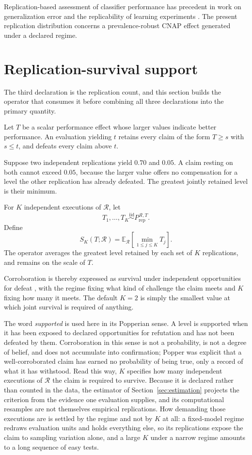 \documentclass[11pt]{article}
\newcommand{\Regime}{\mathcal{R}}
\newcommand{\E}{\mathbb{E}}
\newcommand{\iid}{\mathrel{\overset{\mathrm{iid}}{\sim}}}
\theoremstyle{remark}
\begin{document}
Replication-based assessment of classifier performance has precedent in work on generalization error and the replicability of learning experiments \cite{nadeau2003inference,bouckaert2004estimating}. The present replication distribution concerns a prevalence-robust CNAP effect generated under a declared regime.

\section{Replication-survival support}
\label{sec:support}

The third declaration is the replication count, and this section builds the operator that consumes it before combining all three declarations into the primary quantity.

Let $T$ be a scalar performance effect whose larger values indicate better performance. An evaluation yielding $t$ retains every claim of the form $T\geq s$ with $s\leq t$, and defeats every claim above $t$.

Suppose two independent replications yield $0.70$ and $0.05$. A claim resting on both cannot exceed $0.05$, because the larger value offers no compensation for a level the other replication has already defeated. The greatest jointly retained level is their minimum.

For $K$ independent executions of $\Regime$, let
\[
T_1,\ldots,T_K
\iid
P_{\mathrm{rep}}^{\Regime,T}.
\]
Define
\begin{equation}
S_K(T;\Regime)
=
\E_{\Regime}
\left[
\min_{1\leq j\leq K}T_j
\right].
\label{eq:support-operator}
\end{equation}
The operator averages the greatest level retained by each set of $K$ replications, and remains on the scale of $T$.

Corroboration is thereby expressed as survival under independent opportunities for defeat \cite{popper1959logic}, with the regime fixing what kind of challenge the claim meets and $K$ fixing how many it meets. The default $K=2$ is simply the smallest value at which joint survival is required of anything.

The word \emph{supported} is used here in its Popperian sense. A level is supported when it has been exposed to declared opportunities for refutation and has not been defeated by them. Corroboration in this sense is not a probability, is not a degree of belief, and does not accumulate into confirmation; Popper was explicit that a well-corroborated claim has earned no probability of being true, only a record of what it has withstood. Read this way, $K$ specifies how many independent executions of $\Regime$ the claim is required to survive. Because it is declared rather than counted in the data, the estimator of Section~\ref{sec:estimation} projects the criterion from the evidence one evaluation supplies, and its computational resamples are not themselves empirical replications. How demanding those executions are is settled by the regime and not by $K$ at all: a fixed-model regime redraws evaluation units and holds everything else, so its replications expose the claim to sampling variation alone, and a large $K$ under a narrow regime amounts to a long sequence of easy tests.
\end{document}
